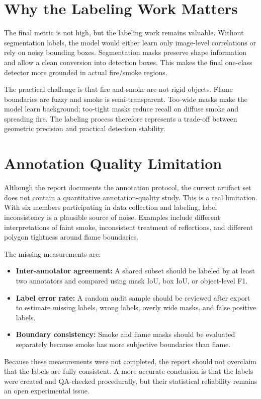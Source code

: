 \documentclass[12pt,a4paper]{report}
\begin{document}
\section{Why the Labeling Work Matters}
The final metric is not high, but the labeling work remains valuable. Without segmentation labels, the model would either learn only image-level correlations or rely on noisy bounding boxes. Segmentation masks preserve shape information and allow a clean conversion into detection boxes. This makes the final one-class detector more grounded in actual fire/smoke regions.

The practical challenge is that fire and smoke are not rigid objects. Flame boundaries are fuzzy and smoke is semi-transparent. Too-wide masks make the model learn background; too-tight masks reduce recall on diffuse smoke and spreading fire. The labeling process therefore represents a trade-off between geometric precision and practical detection stability.

\section{Annotation Quality Limitation}
Although the report documents the annotation protocol, the current artifact set does not contain a quantitative annotation-quality study. This is a real limitation. With six members participating in data collection and labeling, label inconsistency is a plausible source of noise. Examples include different interpretations of faint smoke, inconsistent treatment of reflections, and different polygon tightness around flame boundaries.

The missing measurements are:

\begin{itemize}
    \item \textbf{Inter-annotator agreement:} A shared subset should be labeled by at least two annotators and compared using mask IoU, box IoU, or object-level F1.
    \item \textbf{Label error rate:} A random audit sample should be reviewed after export to estimate missing labels, wrong labels, overly wide masks, and false positive labels.
    \item \textbf{Boundary consistency:} Smoke and flame masks should be evaluated separately because smoke has more subjective boundaries than flame.
\end{itemize}

Because these measurements were not completed, the report should not overclaim that the labels are fully consistent. A more accurate conclusion is that the labels were created and QA-checked procedurally, but their statistical reliability remains an open experimental issue.
\end{document}
